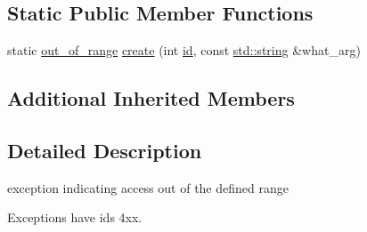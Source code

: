\subsection*{Static Public Member Functions}
\begin{DoxyCompactItemize}
\item 
static \hyperlink{classnlohmann_1_1detail_1_1out__of__range}{out\+\_\+of\+\_\+range} \hyperlink{classnlohmann_1_1detail_1_1out__of__range_a661c8a3af0caeb2621bfb7ae3a02c66b}{create} (int \hyperlink{classnlohmann_1_1detail_1_1exception_a0d4589a3fb54e81646d986c05efa3b9a}{id}, const \hyperlink{namespacenlohmann_1_1detail_a90aa5ef615aa8305e9ea20d8a947980fab45cffe084dd3d20d928bee85e7b0f21}{std\+::string} \&what\+\_\+arg)
\end{DoxyCompactItemize}
\subsection*{Additional Inherited Members}


\subsection{Detailed Description}
exception indicating access out of the defined range 

Exceptions have ids 4xx.

